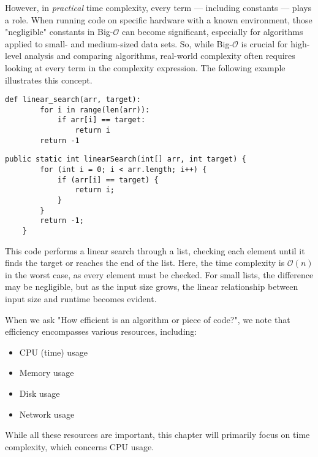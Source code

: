 However, in \textit{practical} time complexity, every term — including constants — plays a role. When running code on specific hardware with a known environment, those "negligible" constants in Big-$\mathcal{O}$ can become significant, especially for algorithms applied to small- and medium-sized data sets. So, while Big-$\mathcal{O}$ is crucial for high-level analysis and comparing algorithms, real-world complexity often requires looking at every term in the complexity expression. The following example illustrates this concept.

\begin{lstlisting}[style=pythonStyle, caption={Linear Search in Python}, label={lst:python_linear_search}]
    def linear_search(arr, target):
        for i in range(len(arr)):
            if arr[i] == target:
                return i
        return -1
\end{lstlisting} \newpage
    
\begin{lstlisting}[style=javaStyle, caption={Linear Search in Java}, label={lst:java_linear_search}]
    public static int linearSearch(int[] arr, int target) {
        for (int i = 0; i < arr.length; i++) {
            if (arr[i] == target) {
                return i;
            }
        }
        return -1;
    }
\end{lstlisting}

This code performs a linear search through a list, checking each element until it finds the target or reaches the end of the list. Here, the time complexity is $\mathcal{O}(n)$ in the worst case, as every element must be checked. For small lists, the difference may be negligible, but as the input size grows, the linear relationship between input size and runtime becomes evident.

When we ask "How efficient is an algorithm or piece of code?", we note that efficiency encompasses various resources, including:
\begin{itemize}
    \item CPU (time) usage
    \item Memory usage
    \item Disk usage
    \item Network usage
\end{itemize}

While all these resources are important, this chapter will primarily focus on time complexity, which concerns CPU usage.

